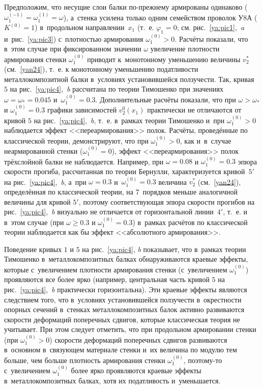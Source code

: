 Предположим, что несущие слои балки по-прежнему армированы одинаково 
($\omega_1^{(-1)}=\omega _1^{(1)}=\omega$), а~стенка усилена только одним семейством проволок У8А 
($K^{(0)}=1$) в~продольном направлении~$x_1$ (т.~е. $\varphi_1=0$; см. рис.~\ref{ya:pic1},~{\sl a} и~рис.~\ref{ya:pic3}) с~плотностью армирования $\omega_1^{(0)}>0$. 
Расчёты показали, что в~этом случае при фиксированном значении $\omega$ увеличение плотности армирования стенки $\omega_1^{(0)}$ приводит к~монотонному уменьшению величины $v_2^*$ (см.~\eqref{yan24}), 
т.~е. к монотонному уменьшению податливости металлокомпозитной балки в~условиях установившейся ползучести. 
Так, кривая~$5$ на рис.~\ref{ya:pic4},~{\sl b} рассчитана по теории Тимошенко при значениях $\omega=\omega_*=0.045$ 
и~$\omega_1^{(0)}=0.3$. 
Дополнительные расчёты показали, что при $\omega>\omega_*$ и $\omega_1^{(0)}=0.3$ 
графики зависимостей $v_2^0(x_1)$ практически не отличаются от кривой $5$ на рис.~\ref{ya:pic4},~{\sl b}, т.~е. 
в~рамках теории Тимошенко и~при $\omega_1^{(0)}>0$ наблюдается эффект <<переармирования>> полок. 
Расчёты, проведённые по классической теории, демонстрируют, что при $\omega_1^{(0)}>0$, 
как и~в~случае неармированной стенки ($\omega_1^{(0)}=0$), 
эффект <<переармирования>> полок трёхслойной балки не наблюдается. 
Например, при $\omega=0.08$ и $\omega_1^{(0)}=0.3$ эпюра скорости прогиба, рассчитанная по теории Бернулли, 
характеризуется кривой~$5'$ на рис.~\ref{ya:pic4},~{\sl b}, 
а~при $\omega=0.3$ и~$\omega_1^{(0)}=0.3$ величина $v_2^*$ (см.~\eqref{yan24}), определённая по классической теории, 
на 7~порядков меньше аналогичной величины для кривой $5'$, 
поэтому соответствующая эпюра скорости прогибов на рис.~\ref{ya:pic4},~{\sl b} визуально не отличается от горизонтальной линии~$4'$, т.~е. и в~этом случае (при $\omega\ge0.3$ и $\omega_1^{(0)}=0.3$) 
в~рамках расчётов по классической теории наблюдается как бы эффект <<абсолютного армирования>>.

Поведение кривых $1$ и $5$ на рис.~\ref{ya:pic4}, {\sl b} показывает, что в~рамках теории Тимошенко в~металлокомпозитных балках обнаруживаются краевые эффекты, которые с~увеличением плотности армирования стенки 
(с~увеличением $\omega_1^{(0)}$) проявляются все более ярко (например, центральная часть кривой $5$ на рис.~\ref{ya:pic4},~{\sl b} практически горизонтальна). 
Эти краевые эффекты являются следствием того, что в~условиях установившейся ползучести в~окрестности опорных сечений в~стенках металлокомпозитных балок активно развиваются скорости деформаций поперечных сдвигов, которые классическая теория не учитывает. 
При этом следует отметить, что при продольном армировании стенки (при $\omega_1^{(0)}>0$) скорости деформаций поперечных сдвигов развиваются в~основном в~связующем материале стенки и~их величина по модулю тем больше, чем больше плотность армирования стенки $\omega_1^{(0)}$, поэтому-то с~увеличением $\omega_1^{(0)}$ более ярко проявляются краевые эффекты в~металлокомпозитных балках, хотя их податливость и~уменьшается.

